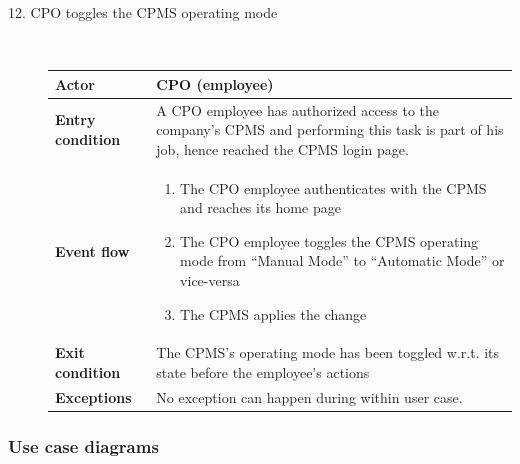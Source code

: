 \documentclass[11pt]{article}
\begin{document}
\begin{description}
    \item [12. CPO toggles the CPMS operating mode] \hfill \\
    \begin{table}[H]
        \centering
        \setlength{\tabcolsep}{18pt}
        \renewcommand{\arraystretch}{1.4}
        \begin{tabularx}{\textwidth}{|>{\hsize=0.5\hsize}X|>{\hsize=1.5\hsize}X|}
            \hline
            \textbf{Actor} & CPO (employee) \\
            \hline
            \textbf{Entry condition} & A CPO employee has authorized access to the company's CPMS and performing this task is part of his job, hence reached the CPMS login page. \\
            \hline
            \textbf{Event flow} & 
                \begin{minipage}[t]{\hsize}
                \begin{enumerate}[topsep=0pt, leftmargin=*]
                    \item The CPO employee authenticates with the CPMS and reaches its home page
                    \item The CPO employee toggles the CPMS operating mode from “Manual Mode” to “Automatic Mode” or vice-versa
                    \item The CPMS applies the change
                \end{enumerate}
                \end{minipage}
                \vspace{6pt}
            \\
            \hline
            \textbf{Exit condition} & The CPMS's operating mode has been toggled w.r.t. its state before the employee's actions \\
            \hline
            \textbf{Exceptions} & No exception can happen during within user case. \\
            \hline
        \end{tabularx}
    \end{table}
\end{description}

\newpage

\subsubsection{Use case diagrams}
\end{document}

